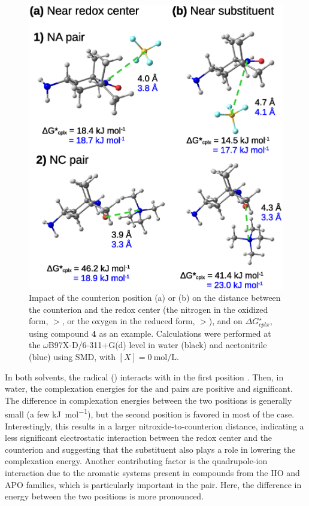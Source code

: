 \documentclass[review,preprint]{elsarticle}
\begin{document}
\begin{figure}[!h]
\centering
\includegraphics[width=.8\linewidth]{Figure12}
\caption{Impact of the counterion position (a) or (b) on the distance between the counterion and the redox center (the nitrogen in the oxidized form, $>$, or the oxygen in the reduced form, $>$), and on $\Delta G^\star_{cplx}$, using compound \textbf{4} as an example. Calculations were performed at the $\omega$B97X-D/6-311+G(d) level in water (black) and acetonitrile (blue) using SMD, with $[X]=\SI{0}{\mole\per\liter}$.}
\label{fig:pos-anion}
\end{figure}

In both solvents, the radical () interacts with  in the first position \cite{zhangEffectHeteroatomFunctionality2018}. Then, in water, the complexation energies for the  and  pairs are positive and significant. The difference in complexation energies between the two positions is generally small (a few \si{\kilo\joule\per\mole}), but the second position is favored in most of the case. Interestingly, this results in a larger nitroxide-to-counterion distance, indicating a less significant electrostatic interaction between the redox center and the counterion and suggesting that the substituent also plays a role in lowering the complexation energy. Another contributing factor is the quadrupole-ion interaction due to the aromatic systems present in compounds from the IIO and APO families, which is particularly important in the  pair. Here, the difference in energy between the two positions is more pronounced.
\end{document}
